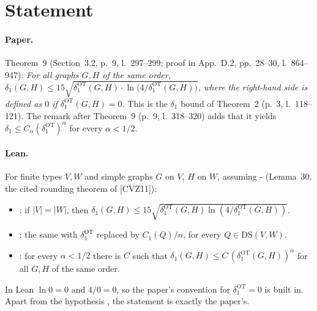 

\paperversion

\section{Statement}

\paragraph{Paper.} Theorem~9 (Section~3.2, p.~9, l.~297--299; proof in App.~D.2, pp.~28--30, l.~864--947):
\emph{For all graphs $G,H$ of the same order,
$\delta_1(G,H)\le15\sqrt{\delta_1^{\mathrm{OT}}(G,H)\cdot\ln\bigl(4/\delta_1^{\mathrm{OT}}(G,H)\bigr)}$, where the
right-hand side is defined as $0$ if $\delta_1^{\mathrm{OT}}(G,H)=0$.} This is the $\delta_1$ bound of
Theorem~2 (p.~3, l.~118--121). The remark after Theorem~9 (p.~9, l.~318--320) adds that it yields
$\delta_1\le C_\alpha(\delta_1^{\mathrm{OT}})^\alpha$ for every $\alpha<1/2$.

\paragraph{Lean.} For finite types $V,W$ and simple graphs $G$ on $V$, $H$ on $W$, assuming
\hyp{} (Lemma~30, the cited rounding theorem of [CVZ11]):
\begin{itemize}
\item {}: if $|V|=|W|$, then
  $\delta_1(G,H)\le15\sqrt{\delta_1^{\mathrm{OT}}(G,H)\ln(4/\delta_1^{\mathrm{OT}}(G,H))}$.
\item {}: the same with $\delta_1^{\mathrm{OT}}$ replaced by $C_1(Q)/n$, for every
  $Q\in\mathrm{DS}(V,W)$.
\item {}: for every $\alpha<1/2$ there is $C$ such that
  $\delta_1(G,H)\le C\,(\delta_1^{\mathrm{OT}}(G,H))^\alpha$ for all $G,H$ of the same order.
\end{itemize}
In Lean $\ln0=0$ and $4/0=0$, so the paper's convention for $\delta_1^{\mathrm{OT}}=0$ is built in. Apart from
the hypothesis , the statement is exactly the paper's.

